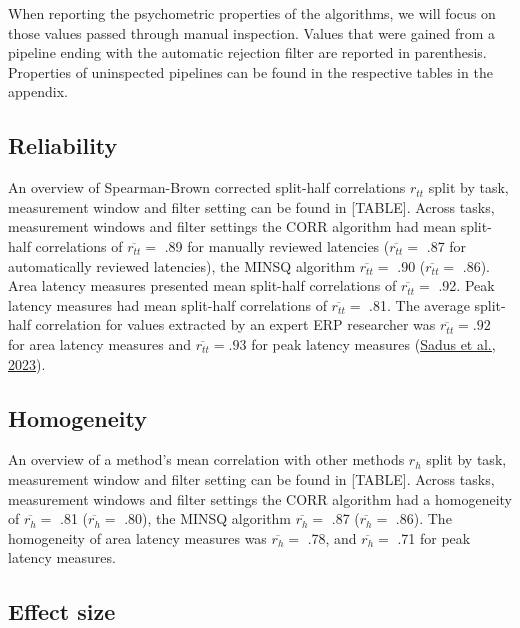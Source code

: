 \documentclass[
  man,floatsintext]{apa7}
\begin{document}
When reporting the psychometric properties of the algorithms, we will focus on those values passed through manual inspection. Values that were gained from a pipeline ending with the automatic rejection filter are reported in parenthesis. Properties of uninspected pipelines can be found in the respective tables in the appendix.

\hypertarget{reliability-1}{%
\subsection{Reliability}\label{reliability-1}}

An overview of Spearman-Brown corrected split-half correlations \(r_{tt}\) split by task, measurement window and filter setting can be found in {[}TABLE{]}. Across tasks, measurement windows and filter settings the CORR algorithm had mean split-half correlations of \(\overline{r_{tt}} =\) .89 for manually reviewed latencies (\(\overline{r_{tt}} =\) .87 for automatically reviewed latencies), the MINSQ algorithm \(\overline{r_{tt}} =\) .90 (\(\overline{r_{tt}} =\) .86). Area latency measures presented mean split-half correlations of \(\overline{r_{tt}} =\) .92. Peak latency measures had mean split-half correlations of \(\overline{r_{tt}} =\) .81. The average split-half correlation for values extracted by an expert ERP researcher was \(\overline{r_{tt}} = .92\) for area latency measures and \(\overline{r_{tt}} = .93\) for peak latency measures (\protect\hyperlink{ref-sadus2023multiverse}{Sadus et al., 2023}).

\hypertarget{homogeneity-1}{%
\subsection{Homogeneity}\label{homogeneity-1}}

An overview of a method's mean correlation with other methods \(r_h\) split by task, measurement window and filter setting can be found in {[}TABLE{]}. Across tasks, measurement windows and filter settings the CORR algorithm had a homogeneity of \(\overline{r_{h}} =\) .81 (\(\overline{r_{h}} =\) .80), the MINSQ algorithm \(\overline{r_{h}} =\) .87 (\(\overline{r_{h}} =\) .86). The homogeneity of area latency measures was \(\overline{r_{h}} =\) .78, and \(\overline{r_{h}} =\) .71 for peak latency measures.

\hypertarget{effect-size-1}{%
\subsection{Effect size}\label{effect-size-1}}
\end{document}
